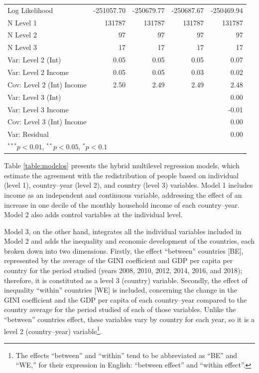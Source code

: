 \documentclass[utf8]{frontiersSCNS} %
\begin{document}
\begin{table}
\begin{tabular}{l D{.}{.}{7.5} D{.}{.}{7.5} D{.}{.}{7.5} D{.}{.}{7.5} }
Log Likelihood                      & -251057.70  & -250679.77  & -250687.67  & -250469.94  \\
N Level 1                           & 131787      & 131787      & 131787      & 131787      \\
N Level 2                           & 97          & 97          & 97          & 97          \\
N Level 3                           & 17          & 17          & 17          & 17          \\
Var: Level 2 (Int)                  & 0.05        & 0.05        & 0.05        & 0.07        \\
Var: Level 2 Income                 & 0.05        & 0.05        & 0.03        & 0.02        \\
Cov: Level 2 (Int) Income           & 2.50        & 2.49        & 2.49        & 2.48        \\
Var: Level 3 (Int)                  &             &             &             & 0.00        \\
Var: Level 3 Income                 &             &             &             & -0.01       \\
Cov: Level 3 (Int) Income           &             &             &             & 0.00        \\
Var: Residual                       &             &             &             & 0.00        \\
\bottomrule
{}
\end{tabular}
\end{table}

Table \ref{table:modelos} presents the hybrid multilevel regression models, which estimate the agreement with the redistribution of people based on individual (level 1), country–year (level 2), and country (level 3) variables. Model 1 includes income as an independent and continuous variable, addressing the effect of an increase in one decile of the monthly household income of each country–year. Model 2 also adds control variables at the individual level.

Model 3, on the other hand, integrates all the individual variables included in Model 2 and adds the inequality and economic development of the countries, each broken down into two dimensions. Firstly, the effect “between” countries [BE], represented by the average of the GINI coefficient and GDP per capita per country for the period studied (years 2008, 2010, 2012, 2014, 2016, and 2018); therefore, it is constituted as a level 3 (country) variable. Secondly, the effect of inequality “within” countries [WE] is included, concerning the change in the GINI coefficient and the GDP per capita of each country–year compared to the country average for the period studied of each of those variables. Unlike the “between” countries effect, these variables vary by country for each year, so it is a level 2 (country–year) variable\footnote{The effects “between” and “within” tend to be abbreviated as “BE” and “WE,” for their expression in English: “between effect” and “within effect”.}.
\end{document}
